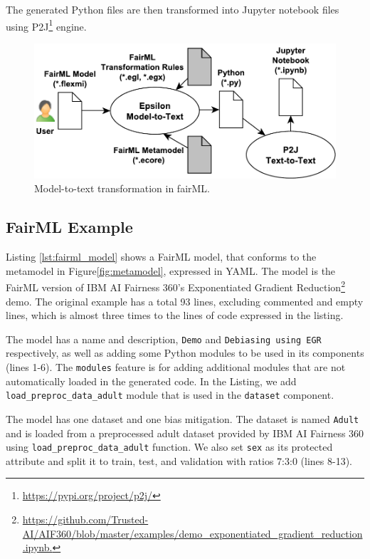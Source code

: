 \documentclass[sigconf,review]{acmart}
\begin{document}
The generated Python files are then transformed into Jupyter notebook files using P2J\footnote{\url{https://pypi.org/project/p2j/}} engine.

\begin{figure}
	\includegraphics[width=\linewidth]{figures/transformation}
	\caption{Model-to-text transformation in fairML.}
	\label{fig:transformation}
\end{figure}



\subsection{FairML Example}
\label{sec:fairml_example}
Listing \ref{lst:fairml_model} shows a FairML model, that conforms to the metamodel in Figure\ref{fig:metamodel}, expressed in YAML. The model is the FairML version of 
IBM AI Fairness 360's Exponentiated Gradient Reduction\footnote{\url{https://github.com/Trusted-AI/AIF360/blob/master/examples/demo_exponentiated_gradient_reduction.ipynb.}} demo. The original example has a total 93 lines, excluding commented and empty lines, which is almost three times to the lines of code expressed in the listing.

The model has a name and description, \texttt{Demo} and \texttt{Debiasing using EGR} respectively, as well as adding some Python modules to be used in its components (lines 1-6). The \texttt{modules} feature is for adding additional modules that are not automatically loaded in the generated code. In the Listing, we add \texttt{load\_preproc\_data\_adult} module that is used in the \texttt{dataset} component.

The model has one dataset and one bias mitigation. The dataset is named \texttt{Adult} and is loaded from a preprocessed adult dataset provided by IBM AI Fairness 360 using \texttt{load\_preproc\_data\_adult} function. We also set \texttt{sex} as its protected attribute and split it to train, test, and validation with ratios 7:3:0 (lines 8-13). 
\end{document}
